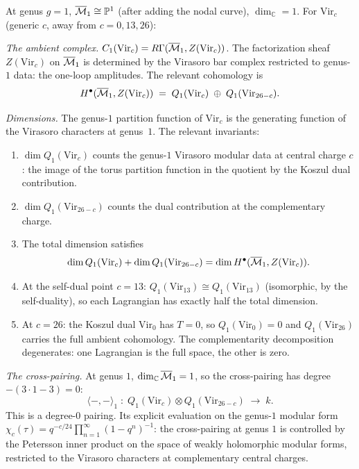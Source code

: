 \begin{computation}
At genus $g = 1$, $\overline{\mathcal{M}}_1 \cong \mathbb{P}^1$
(after adding the nodal curve), $\dim_\mathbb{C} = 1$.
For $\mathrm{Vir}_c$ (generic $c$, away from $c = 0, 13, 26$):

\emph{The ambient complex.}
$C_1(\mathrm{Vir}_c) = R\Gamma(\overline{\mathcal{M}}_1, Z(\mathrm{Vir}_c))$.
The factorization sheaf $Z(\mathrm{Vir}_c)$ on $\overline{\mathcal{M}}_1$
is determined by the Virasoro bar complex restricted to
genus-$1$ data: the one-loop amplitudes.
The relevant cohomology is
\[
H^\bullet(\overline{\mathcal{M}}_1, Z(\mathrm{Vir}_c))
\;=\;
Q_1(\mathrm{Vir}_c) \;\oplus\; Q_1(\mathrm{Vir}_{26-c}).
\]

\emph{Dimensions.}
The genus-$1$ partition function of $\mathrm{Vir}_c$ is the
generating function of the Virasoro characters at genus~$1$.
The relevant invariants:
\begin{enumerate}[label=\textup{(\roman*)}]
\item $\dim Q_1(\mathrm{Vir}_c)$ counts the genus-$1$
 Virasoro modular data at central charge $c$:
 the image of the torus partition function in the
 quotient by the Koszul dual contribution.
\item $\dim Q_1(\mathrm{Vir}_{26-c})$ counts the dual
 contribution at the complementary charge.
\item The total dimension satisfies
 \[
 \dim Q_1(\mathrm{Vir}_c) + \dim Q_1(\mathrm{Vir}_{26-c})
 = \dim H^\bullet(\overline{\mathcal{M}}_1, Z(\mathrm{Vir}_c)).
 \]
\item At the self-dual point $c = 13$:
 $Q_1(\mathrm{Vir}_{13}) \cong Q_1(\mathrm{Vir}_{13})$
 (isomorphic, by the self-duality),
 so each Lagrangian has exactly half the total dimension.
\item At $c = 26$: the Koszul dual $\mathrm{Vir}_0$ has
 $T = 0$, so $Q_1(\mathrm{Vir}_0) = 0$ and
 $Q_1(\mathrm{Vir}_{26})$ carries the full ambient cohomology.
 The complementarity decomposition degenerates: one Lagrangian
 is the full space, the other is zero.
\end{enumerate}

\emph{The cross-pairing.}
At genus $1$, $\dim_\mathbb{C}\overline{\mathcal{M}}_1 = 1$, so the
cross-pairing has degree $-(3 \cdot 1 - 3) = 0$:
\[
\langle -, - \rangle_1
\;:\;
Q_1(\mathrm{Vir}_c) \otimes Q_1(\mathrm{Vir}_{26-c})
\;\longrightarrow\; k.
\]
This is a degree-$0$ pairing.
Its explicit evaluation on the genus-$1$ modular form
$\chi_c(\tau) = q^{-c/24}\prod_{n=1}^\infty(1-q^n)^{-1}$:
the cross-pairing at genus $1$ is controlled by the
Petersson inner product on the space of weakly holomorphic
modular forms, restricted to the Virasoro characters
at complementary central charges.
\end{computation}

